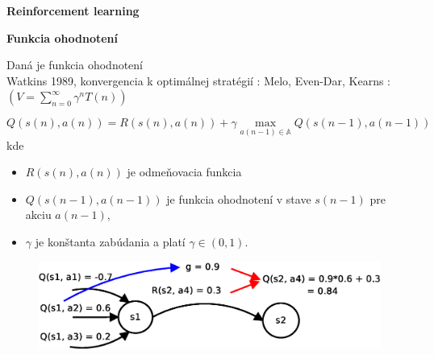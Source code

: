 \documentclass[xcolor=dvipsnames]{beamer}
\begin{document}
\begin{frame}{\bf Reinforcement learning}
\begin{minipage}{.5\textwidth}
\end{minipage}

\end{frame}


\begin{frame}{\bf Funkcia ohodnotení}

Daná je funkcia ohodnotení \\
{\footnotesize Watkins 1989, konvergencia k optimálnej stratégií : Melo, Even-Dar, Kearns : $\left( V = \sum\limits_{n=0}^{\infty} \gamma^n T(n) \right)$}

\begin{equation}
Q(s(n),a(n)) = R(s(n),a(n)) + \gamma \max_{a(n-1) \in \mathbb{A}} Q(s(n-1), a(n-1)) \nonumber
\label{eq:q_learning}
\end{equation}
kde \\

\begin{itemize}
 \item $R(s(n),a(n))$ je odmeňovacia funkcia \\
 \item $Q(s(n-1),a(n-1))$ je funkcia ohodnotení v stave $s(n-1)$ pre akciu $a(n-1)$, \\
 \item $\gamma$ je konštanta zabúdania a platí $\gamma \in (0, 1)$.
\end{itemize}

\begin{figure}[!htb]
\includegraphics[scale=.4]{../diagrams/q_learning_detail.eps}
\end{figure}

\end{frame}
\end{document}

